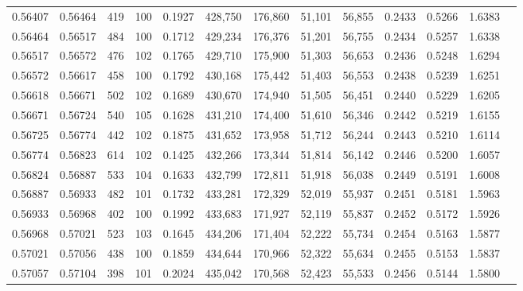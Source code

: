 \begin{tabular}{rrrrrrrrrrrrr}
0.56407 & 0.56464 &   419 & 100 &                                     0.1927 & 428,750 & 176,860 &  51,101 &  56,855 & 0.2433 & 0.5266 & 1.6383 \\
0.56464 & 0.56517 &   484 & 100 &                                     0.1712 & 429,234 & 176,376 &  51,201 &  56,755 & 0.2434 & 0.5257 & 1.6338 \\
0.56517 & 0.56572 &   476 & 102 &                                     0.1765 & 429,710 & 175,900 &  51,303 &  56,653 & 0.2436 & 0.5248 & 1.6294 \\
0.56572 & 0.56617 &   458 & 100 &                                     0.1792 & 430,168 & 175,442 &  51,403 &  56,553 & 0.2438 & 0.5239 & 1.6251 \\
0.56618 & 0.56671 &   502 & 102 &                                     0.1689 & 430,670 & 174,940 &  51,505 &  56,451 & 0.2440 & 0.5229 & 1.6205 \\
0.56671 & 0.56724 &   540 & 105 &                                     0.1628 & 431,210 & 174,400 &  51,610 &  56,346 & 0.2442 & 0.5219 & 1.6155 \\
0.56725 & 0.56774 &   442 & 102 &                                     0.1875 & 431,652 & 173,958 &  51,712 &  56,244 & 0.2443 & 0.5210 & 1.6114 \\
0.56774 & 0.56823 &   614 & 102 &                                     0.1425 & 432,266 & 173,344 &  51,814 &  56,142 & 0.2446 & 0.5200 & 1.6057 \\
0.56824 & 0.56887 &   533 & 104 &                                     0.1633 & 432,799 & 172,811 &  51,918 &  56,038 & 0.2449 & 0.5191 & 1.6008 \\
0.56887 & 0.56933 &   482 & 101 &                                     0.1732 & 433,281 & 172,329 &  52,019 &  55,937 & 0.2451 & 0.5181 & 1.5963 \\
0.56933 & 0.56968 &   402 & 100 &                                     0.1992 & 433,683 & 171,927 &  52,119 &  55,837 & 0.2452 & 0.5172 & 1.5926 \\
0.56968 & 0.57021 &   523 & 103 &                                     0.1645 & 434,206 & 171,404 &  52,222 &  55,734 & 0.2454 & 0.5163 & 1.5877 \\
0.57021 & 0.57056 &   438 & 100 &                                     0.1859 & 434,644 & 170,966 &  52,322 &  55,634 & 0.2455 & 0.5153 & 1.5837 \\
0.57057 & 0.57104 &   398 & 101 &                                     0.2024 & 435,042 & 170,568 &  52,423 &  55,533 & 0.2456 & 0.5144 & 1.5800 \\

\end{tabular}
